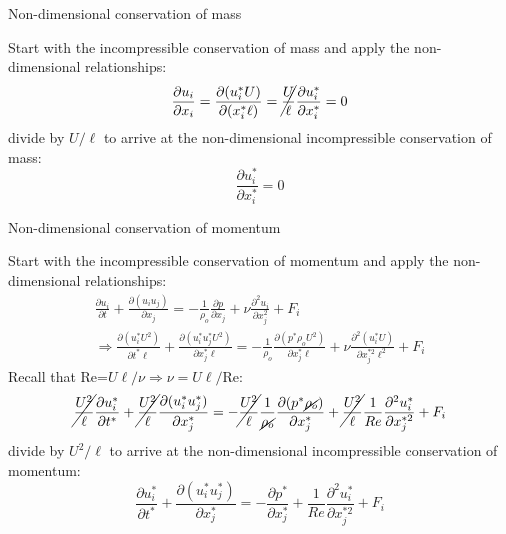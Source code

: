 
\begin{frame}{Non-dimensional conservation of mass}

Start with the incompressible conservation of mass and apply the non-dimensional relationships:
$$\frac{\partial u_i}{\partial x_i} = \frac{\partial (u_i^* U)}{\partial (x_i^* \ell)} = \cancel{\frac{U}{\ell}}\frac{\partial u_i^*}{\partial x_i^*} = 0$$
divide by $U/\ell$ to arrive at the non-dimensional incompressible conservation of mass:
$$\boxed{\frac{\partial u_i^*}{\partial x_i^*} = 0}$$
\end{frame}


\begin{frame}{Non-dimensional conservation of momentum}

Start with the incompressible conservation of momentum and apply the non-dimensional relationships:
\begin{gather*}
\frac{\partial u_i}{\partial t} + \frac{\partial (u_i u_j)}{\partial x_j} = - \frac{1}{\rho_o}\frac{\partial p}{\partial x_j} + \nu \frac{\partial^2 u_i}{\partial x_j^2} + F_i\\
\Rightarrow \frac{\partial (u_i^* U^2)}{\partial t^* \ell} + \frac{\partial (u_i^* u_j^* U^2)}{\partial x_j^*\ell} = - \frac{1}{\rho_o}\frac{\partial (p^* \rho_o U^2)}{\partial x_j^* \ell} + \nu \frac{\partial^2 (u_i^* U)}{\partial x_j^{*2}\ell^2} + F_i
\end{gather*}
Recall that Re=$U\ell/\nu \Rightarrow \nu = U\ell/$Re:
$$
\cancel{\frac{U^2}{\ell}}\frac{\partial u_i^*}{\partial t^*} + \cancel{\frac{U^2}{\ell}}\frac{\partial (u_i^* u_j^*)}{\partial x_j^*} = - \cancel{\frac{U^2}{\ell}}\frac{1}{\cancel{\rho_o}}\frac{\partial (p^* \cancel{\rho_o})}{\partial x_j^*} + \cancel{\frac{U^2}{\ell}}\frac{1}{Re} \frac{\partial^2 u_i^*}{\partial x_j^{*2}} + F_i
$$
divide by $U^2/\ell$ to arrive at the non-dimensional incompressible conservation of momentum:
$$\boxed{\frac{\partial u_i^*}{\partial t^*} + \frac{\partial (u_i^* u_j^*)}{\partial x_j^*} = - \frac{\partial p^*}{\partial x_j^*} + \frac{1}{Re} \frac{\partial^2 u_i^*}{\partial x_j^{*2}} + F_i}$$
\end{frame}



